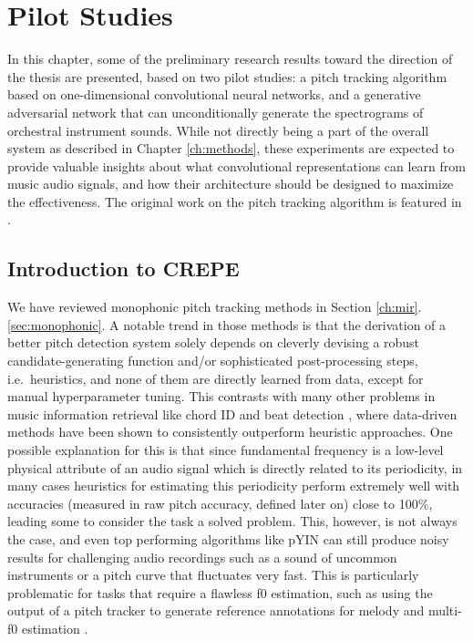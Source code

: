 
\graphicspath{{5-pilot/figures/}}
\chapter{Pilot Studies}
\label{ch:pilot}


In this chapter, some of the preliminary research results toward the direction of the thesis are presented, based on two pilot studies: a pitch tracking algorithm based on one-dimensional convolutional neural networks, and a generative adversarial network that can unconditionally generate the spectrograms of orchestral instrument sounds.
While not directly being a part of the overall system as described in Chapter \ref{ch:methods}, these experiments are expected to provide valuable insights about what convolutional representations can learn from music audio signals, and how their architecture should be designed to maximize the effectiveness.
The original work on the pitch tracking algorithm is featured in \cite{kim2018crepe}.


\section{Introduction to CREPE}\label{sec:introduction}

We have reviewed monophonic pitch tracking methods in Section \ref{ch:mir}.\ref{sec:monophonic}.
A notable trend in those methods is that the derivation of a better pitch detection system solely depends on cleverly devising a robust candidate-generating function and/or sophisticated post-processing steps, i.e.~heuristics, and none of them are directly learned from data, except for manual hyperparameter tuning.
This contrasts with many other problems in music information retrieval like chord ID \cite{humphrey2012rethinking} and beat detection \cite{bock2011enhanced}, where data-driven methods have been shown to consistently outperform heuristic approaches.
One possible explanation for this is that since fundamental frequency is a low-level physical attribute of an audio signal which is directly related to its periodicity, in many cases heuristics for estimating this periodicity perform extremely well with accuracies (measured in raw pitch accuracy, defined later on) close to 100\%, leading some to consider the task a solved problem.
This, however, is not always the case, and even top performing algorithms like pYIN can still produce noisy results for challenging audio recordings such as a sound of uncommon instruments or a pitch curve that fluctuates very fast.
This is particularly problematic for tasks that require a flawless f0 estimation, such as using the output of a pitch tracker to generate reference annotations for melody and multi-f0 estimation \cite{salamon2017analysis,bittner2017deepsalience}.

